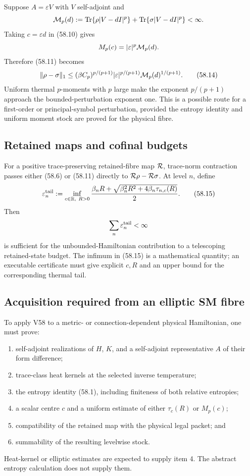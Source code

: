 \documentclass[11pt]{article}
\theoremstyle{remark}
\begin{document}
Suppose \(A=\varepsilon V\) with \(V\) self-adjoint and
\[
 {\cal M}_p(d)
 :=
 \operatorname{Tr}\{\rho|V-dI|^p\}
 +
 \operatorname{Tr}\{\sigma|V-dI|^p\}<\infty.
\]
Taking \(c=\varepsilon d\) in (58.10) gives
\[
                         M_p(c)
 =
 |\varepsilon|^p{\cal M}_p(d).
\]
Therefore (58.11) becomes
\begin{equation}
 \|\rho-\sigma\|_1
 \leq
 (\beta C_p)^{p/(p+1)}
 |\varepsilon|^{p/(p+1)}
 {\cal M}_p(d)^{1/(p+1)}.                         \tag{58.14}
\end{equation}
Uniform thermal \(p\)-moments with \(p\) large make the exponent
\(p/(p+1)\) approach the bounded-perturbation exponent one.  This is
a possible route for a first-order or principal-symbol perturbation,
provided the entropy identity and uniform moment stock are proved
for the physical fibre.

\subsection{Retained maps and cofinal budgets}

For a positive trace-preserving retained-fibre map \({\cal R}\),
trace-norm contraction passes either (58.6) or (58.11) directly to
\({\cal R}\rho-{\cal R}\sigma\).  At level \(n\), define
\begin{equation}
 \varepsilon_n^{\rm tail}
 :=
 \inf_{c\in\mathbb R,\ R>0}
 {\beta_n R+
 \sqrt{\beta_n^2R^2+4\beta_n\tau_{n,c}(R)}
 \over2}.                                         \tag{58.15}
\end{equation}
Then
\[
 \sum_n\varepsilon_n^{\rm tail}<\infty
\]
is sufficient for the unbounded-Hamiltonian contribution to a
telescoping retained-state budget.  The infimum in (58.15) is a
mathematical quantity; an executable certificate must give explicit
\(c,R\) and an upper bound for the corresponding thermal tail.

\subsection{Acquisition required from an elliptic SM fibre}

To apply V58 to a metric- or connection-dependent physical
Hamiltonian, one must prove:
\begin{enumerate}
\item self-adjoint realizations of \(H\), \(K\), and a self-adjoint
representative \(A\) of their form difference;
\item trace-class heat kernels at the selected inverse temperature;
\item the entropy identity (58.1), including finiteness of both
relative entropies;
\item a scalar centre \(c\) and a uniform estimate of either
\(\tau_c(R)\) or \(M_p(c)\);
\item compatibility of the retained map with the physical legal
packet; and
\item summability of the resulting levelwise stock.
\end{enumerate}
Heat-kernel or elliptic estimates are expected to supply item 4.
The abstract entropy calculation does not supply them.
\end{document}
